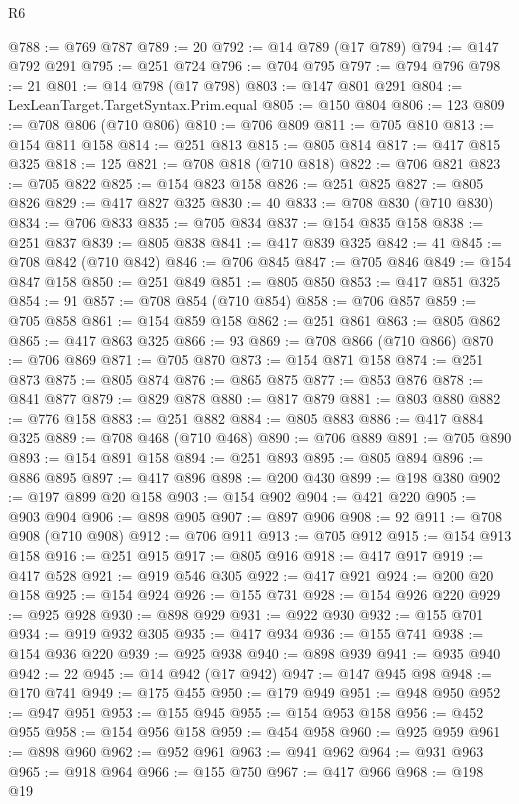 \begin{lexlean}{R6}
\begin{coremodule}
{{{{{{{{{{{{{{{{{{{{{{{{{{{{{{{{{{{{{{{{{{{{{{{{{{{{{{{{{{{{{{{{{{{{{{{{@788 := @769 @787
@789 := 20
@792 := @14 @789 (@17 @789)
@794 := @147 @792 @291
@795 := @251 @724
@796 := @704 @795
@797 := @794 @796
@798 := 21
@801 := @14 @798 (@17 @798)
@803 := @147 @801 @291
@804 := LexLeanTarget.TargetSyntax.Prim.equal
@805 := @150 @804
@806 := 123
@809 := @708 @806 (@710 @806)
@810 := @706 @809
@811 := @705 @810
@813 := @154 @811 @158
@814 := @251 @813
@815 := @805 @814
@817 := @417 @815 @325
@818 := 125
@821 := @708 @818 (@710 @818)
@822 := @706 @821
@823 := @705 @822
@825 := @154 @823 @158
@826 := @251 @825
@827 := @805 @826
@829 := @417 @827 @325
@830 := 40
@833 := @708 @830 (@710 @830)
@834 := @706 @833
@835 := @705 @834
@837 := @154 @835 @158
@838 := @251 @837
@839 := @805 @838
@841 := @417 @839 @325
@842 := 41
@845 := @708 @842 (@710 @842)
@846 := @706 @845
@847 := @705 @846
@849 := @154 @847 @158
@850 := @251 @849
@851 := @805 @850
@853 := @417 @851 @325
@854 := 91
@857 := @708 @854 (@710 @854)
@858 := @706 @857
@859 := @705 @858
@861 := @154 @859 @158
@862 := @251 @861
@863 := @805 @862
@865 := @417 @863 @325
@866 := 93
@869 := @708 @866 (@710 @866)
@870 := @706 @869
@871 := @705 @870
@873 := @154 @871 @158
@874 := @251 @873
@875 := @805 @874
@876 := @865 @875
@877 := @853 @876
@878 := @841 @877
@879 := @829 @878
@880 := @817 @879
@881 := @803 @880
@882 := @776 @158
@883 := @251 @882
@884 := @805 @883
@886 := @417 @884 @325
@889 := @708 @468 (@710 @468)
@890 := @706 @889
@891 := @705 @890
@893 := @154 @891 @158
@894 := @251 @893
@895 := @805 @894
@896 := @886 @895
@897 := @417 @896
@898 := @200 @430
@899 := @198 @380
@902 := @197 @899 @20 @158
@903 := @154 @902
@904 := @421 @220
@905 := @903 @904
@906 := @898 @905
@907 := @897 @906
@908 := 92
@911 := @708 @908 (@710 @908)
@912 := @706 @911
@913 := @705 @912
@915 := @154 @913 @158
@916 := @251 @915
@917 := @805 @916
@918 := @417 @917
@919 := @417 @528
@921 := @919 @546 @305
@922 := @417 @921
@924 := @200 @20 @158
@925 := @154 @924
@926 := @155 @731
@928 := @154 @926 @220
@929 := @925 @928
@930 := @898 @929
@931 := @922 @930
@932 := @155 @701
@934 := @919 @932 @305
@935 := @417 @934
@936 := @155 @741
@938 := @154 @936 @220
@939 := @925 @938
@940 := @898 @939
@941 := @935 @940
@942 := 22
@945 := @14 @942 (@17 @942)
@947 := @147 @945 @98
@948 := @170 @741
@949 := @175 @455
@950 := @179 @949
@951 := @948 @950
@952 := @947 @951
@953 := @155 @945
@955 := @154 @953 @158
@956 := @452 @955
@958 := @154 @956 @158
@959 := @454 @958
@960 := @925 @959
@961 := @898 @960
@962 := @952 @961
@963 := @941 @962
@964 := @931 @963
@965 := @918 @964
@966 := @155 @750
@967 := @417 @966
@968 := @198 @19
}}}}}}}}}}}}}}}}}}}}}}}}}}}}}}}}}}}}}}}}}}}}}}}}}}}}}}}}}}}}}}}}}}}}}}}}
\end{coremodule}
\end{lexlean}
